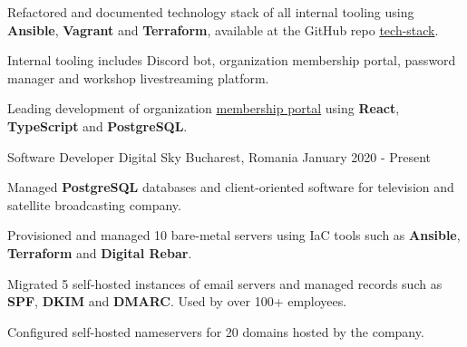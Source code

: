 \begin{cventries}
{\begin{cvitems}
      \item {Refactored and documented technology stack of all internal tooling using \textbf{Ansible}, \textbf{Vagrant} and \textbf{Terraform}, available at the GitHub repo \href{https://github.com/acmucsd/tech-stack}{tech-stack}.}
      \item {Internal tooling includes Discord bot, organization membership portal, password manager and workshop livestreaming platform.}
      \item {Leading development of organization \href{https://github.com/acmucsd/membership-portal-ui}{membership portal} using \textbf{React}, \textbf{TypeScript} and \textbf{PostgreSQL}.}
    \end{cvitems}
  }
  \cventry
    {Software Developer}
    {Digital Sky}
    {Bucharest, Romania}
    {January 2020 - Present}
    {
      \begin{cvitems}
        \item {Managed \textbf{PostgreSQL} databases and client-oriented software for television and satellite broadcasting company.}
        \item {Provisioned and managed 10 bare-metal servers using IaC tools such as \textbf{Ansible}, \textbf{Terraform} and \textbf{Digital Rebar}.}
        \item {Migrated 5 self-hosted instances of email servers and managed records such as \textbf{SPF}, \textbf{DKIM} and \textbf{DMARC}. Used by over 100+ employees.}
        \item {Configured self-hosted nameservers for 20 domains hosted by the company.}
      \end{cvitems}
    }
\end{cventries}
